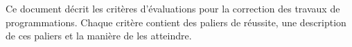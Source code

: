 Ce document décrit les critères d'évaluations pour la correction des travaux de programmations. Chaque critère contient des paliers de réussite, une description de ces paliers et la manière de les atteindre.